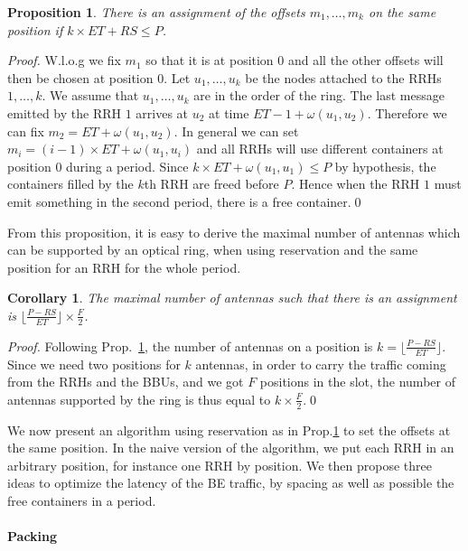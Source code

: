 \documentclass[10pt, conference, letterpaper]{IEEEtran}
\newtheorem{prop}{Proposition}
\newtheorem{corollary}{Corollary}[theorem]
\begin{document}
\begin{prop}
\label{prop:assign}
There is an assignment of the offsets $m_1, \dots, m_k$ on the same position if  $k\times ET + RS \leq P$.
\end{prop}
\begin{proof}
 W.l.o.g we fix $m_1$ so that it is at position $0$ and all the other offsets will then be chosen at position $0$. 
 Let $u_1,\dots,u_k$ be the nodes attached to the RRHs $1,\dots,k$. We assume that $u_1,\dots,u_k$ are in the order of the ring. The last message emitted by the RRH $1$ arrives at $u_2$ at time $ET - 1 + \omega(u_1,u_2)$. Therefore we can fix $m_2 =  ET  + \omega(u_1,u_2)$. In general we can set $m_i = (i-1) \times ET + \omega(u_1,u_i)$ and all RRHs will use different containers at position $0$ during a period. Since $k \times ET + \omega(u_1,u_1) \leq P$ by hypothesis,
 the containers filled by the $k$th RRH are freed before $P$. Hence when the RRH $1$ must emit something in the second period, there is a free container.\qed
\end{proof}

From this proposition, it is easy to derive the maximal number of antennas which can be supported by an optical ring,
when using reservation and the same position for an RRH for the whole period.

\begin{corollary}
The maximal number of antennas such that there is an assignment is $ \lfloor\frac{P- RS}{ET}\rfloor \times \frac{F}{2}$.
\end{corollary}
\begin{proof}
Following Prop.~\ref{prop:assign}, the number of antennas on a position is $k = \lfloor\frac{P- RS}{ET}\rfloor $.
Since we need two positions for $k$ antennas, in order to carry the traffic coming from the RRHs and the BBUs, and we got $F$ positions in the slot, the number of antennas supported by the ring is thus equal to $k \times \frac{F}{2}$.\qed
\end{proof}


We now present an algorithm using reservation as in Prop.\ref{prop:assign} to set the offsets at the same position.
In the naive version of the algorithm, we put each RRH in an arbitrary position, for instance one RRH by position.
 We then propose three ideas to optimize the latency of the BE traffic, by spacing as well as possible the free containers in a period.


\paragraph{Packing}
\end{document}
